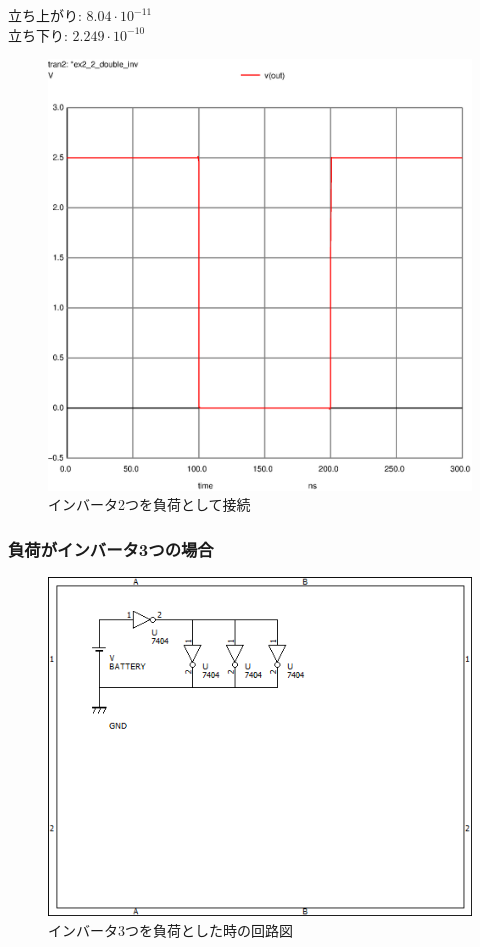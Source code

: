 \documentclass{jsarticle}
\begin{document}
\begin{flushleft}
    立ち上がり: $8.04\cdot 10^{-11}$\\
    立ち下り: $2.249 \cdot 10^{-10}$
\end{flushleft}
\begin{figure}[H]
    \hspace{50pt}
    \includegraphics[scale=0.8]{ex2_2_double_inv.ps}
    \vspace{30pt}
    \caption{インバータ2つを負荷として接続}
\end{figure}


\subsubsection{負荷がインバータ3つの場合}
\begin{figure}[H]
    \centering
    \includegraphics[bb=0 0 500 400]{ex2_2_triple_inv.png}
    \caption{インバータ3つを負荷とした時の回路図}
\end{figure}
\end{document}
